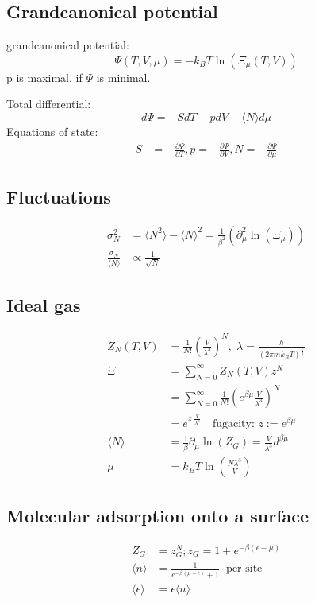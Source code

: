 \subsection*{Grandcanonical potential}
grandcanonical potential:
\[
    \Psi(T,V,\mu) = -k_B T \ln \left( \Xi_\mu (T,V)\right)
\]
p is maximal, if $\Psi$ is minimal. 

Total differential:
\[
        d\Psi = -SdT -pdV - \langle N \rangle d\mu
\]
Equations of state:
\[
    \begin{aligned}
        S &= - \frac{\partial \Psi}{\partial T} , p = - \frac{\partial \Psi}{\partial V}, N = - \frac{\partial \Psi}{\partial \mu}
    \end{aligned}
\]

\subsection*{Fluctuations}
\[
    \begin{aligned}
        \sigma_N^2 &= \langle N^2 \rangle - \langle N \rangle^2 = \frac{1}{\beta^2} \left( \partial_\mu^2 \ln(\Xi_\mu) \right) \\
        \frac{\sigma_N}{\langle N \rangle} & \propto \frac{1}{\sqrt{N}}
    \end{aligned}
\]

\subsection*{Ideal gas}

\[
    \begin{aligned}
        Z_N(T,V) &= \frac{1}{N!} \left(\frac{V}{\lambda^3}\right)^N , \; \lambda = \frac{h}{(2 \pi m k_B T)^\frac{1}{2}} \\
        \Xi &= \sum_{N=0}^\infty Z_N(T,V)z^N \\
            &= \sum_{N=0}^\infty \frac{1}{N!}\left(e^{\beta \mu} \frac{V}{\lambda^3}\right)^N \\
            &= e^{z \; \frac{V}{\lambda^3}} \quad \text{fugacity: } z:= e^{\beta \mu} \\
        \langle N \rangle &= \frac{1}{\beta} \partial_\mu \ln (Z_G) = \frac{V}{\lambda^3} d^{\beta \mu} \\
        \mu &= k_B T \ln \left(\frac{N \lambda^3}{V}\right)
    \end{aligned}
\]

\subsection*{Molecular adsorption onto a surface}

\[
    \begin{aligned}
        Z_G &= z_G^N; z_G = 1+ e^{-\beta(\epsilon -\mu)} \\
        \langle n \rangle &= \frac{1}{e^{-\beta(\mu-\epsilon)}+1} \; \text{ per site} \\
        \langle \epsilon \rangle &= \epsilon \langle n \rangle
    \end{aligned}
\]